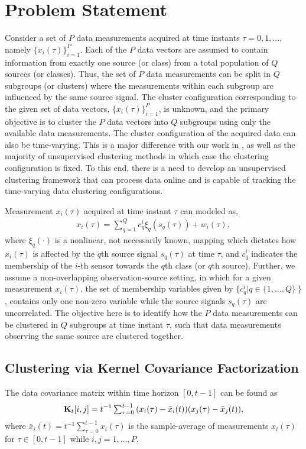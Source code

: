 \documentclass[10pt,final]{IEEEtran}
\begin{document}
\section{Problem Statement}\label{sec:problem_statement}
Consider a set of $P$ data measurements acquired at time instants $\tau=0,1,\ldots$, namely $\{x_{i}(\tau)\}_{i=1}^{P}$. Each of the $P$ data vectors are assumed to contain information from exactly one source (or class) from a total population of $Q$ sources (or classes). Thus, the set of $P$ data measurements can be split in $Q$ subgroups (or clusters) where the measurements within each subgroup are influenced by the same source signal. The cluster configuration corresponding to the given set of data vectors, $\{x_{i}(\tau)\}_{i=1}^{P}$, is unknown, and the primary objective is to  cluster the $P$ data vectors into $Q$ subgroups using only the available data measurements. The cluster configuration of the acquired data can also be time-varying. This is a major difference with our work in \cite{DCA}, as well as the majority of unsupervised clustering methods \cite{tkmgc,SPMKC} in which case the clustering configuration is fixed. To this end, there is a  need to develop an unsupervised clustering framework that can process data online and is capable of tracking the time-varying data clustering configurations.

Measurement $x_i(\tau)$ acquired at time instant $\tau$ can modeled as,  
\begin{align}\label{eq:linear_relation}
x_{i}(\tau) =\textstyle \sum_{q=1}^{Q}c_q^i \xi_q(s_q(\tau))+w_i(\tau),
\end{align}
where $\xi_q(\cdot)$ is a nonlinear, not necessarily known, mapping which dictates how $x_i(\tau)$ is affected by  the $q$th source signal $s_q(\tau)$ at time $\tau$, and $c_q^i$ indicates the membership of the $i$-th sensor towards the $q$th class (or $q$th source). Further, we assume a non-overlapping observation-source setting, in which for a given measurement $x_i(\tau)$, the set of  membership variables given by $\{c_q^i | q \in \{1, ..., Q\}~\}$, contains only one non-zero variable while the source signals $s_q(\tau)$ are uncorrelated. The objective here is to identify how the  $P$ data measurements can be clustered in $Q$ subgroups at time instant $\tau$, such that data measurements observing the same source are clustered together.


\subsection{Clustering via Kernel Covariance Factorization}\label{sec:Fact_Kernel}
 The data covariance matrix within time horizon $[0,t-1]$ can be found as
\begin{equation}\label{eq:linear_correlation}
\mathbf{K}_t[i,j] = {t}^{-1}\textstyle\textstyle\sum_{\tau= 0}^{t-1}{(x_i(\tau) - \bar{x}_i(t))(x_j(\tau)-\bar{x}_j(t))} ,
\end{equation}
where $\bar{x}_i(t) = t^{-1} \sum_{\tau=0}^{t-1} x_i(\tau)$ is the sample-average of measurements $x_i(\tau)$ for $\tau\in[0,t-1]$ while $i,j=1,\ldots,P$.
\end{document}
